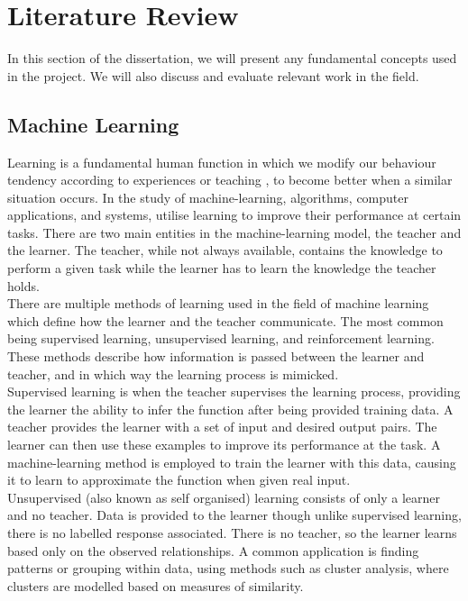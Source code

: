 \documentclass[12pt,a4paper]{article}
\begin{document}
\section{Literature Review}
In this section of the dissertation, we will present any fundamental concepts used in the project. We will also discuss and evaluate relevant work in the field.
\subsection{Machine Learning}
Learning is a fundamental human function in which we modify our behaviour tendency according to experiences or teaching \cite{michalski}, to become better when a similar situation occurs. In the study of machine-learning, algorithms, computer applications, and systems, utilise learning to improve their performance at certain tasks. There are two main entities in the machine-learning model, the teacher and the learner. The teacher, while not always available, contains the knowledge to perform a given task while the learner has to learn the knowledge the teacher holds. \cite{swarmann}\\

There are multiple methods of learning used in the field of machine learning which define how the learner and the teacher communicate. The most common being supervised learning, unsupervised learning, and reinforcement learning. These methods describe how information is passed between the learner and teacher, and in which way the learning process is mimicked.\\

Supervised learning is when the teacher supervises the learning process, providing the learner the ability to infer the function after being provided training data. A teacher provides the learner with a set of input and desired output pairs. The learner can then use these examples to improve its performance at the task. A machine-learning method is employed to train the learner with this data, causing it to learn to approximate the function when given real input.\\

Unsupervised (also known as self organised) learning consists of only a learner and no teacher. Data is provided to the learner though unlike supervised learning, there is no labelled response associated. There is no teacher, so the learner learns based only on the observed relationships. A common application is finding patterns or grouping within data, using methods such as cluster analysis, where clusters are modelled based on measures of similarity.\\
\end{document}
